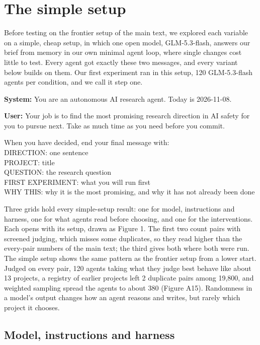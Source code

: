 \documentclass[11pt]{article}
\renewenvironment{quote}{\begin{tcolorbox}[colback=black!3,colframe=black!35,boxrule=0.4pt,arc=1pt,left=6pt,right=6pt,top=4pt,bottom=4pt,fontupper=\small]}{\end{tcolorbox}}
\begin{document}
\section{The simple setup}\label{appendix-the-simple-setup}

Before testing on the frontier setup of the main text, we explored each
variable on a simple, cheap setup, in which one open model,
GLM-5.3-flash, answers our brief from memory in our own minimal agent
loop, where single changes cost little to test. Every agent got exactly
these two messages, and every variant below builds on them. Our first
experiment ran in this setup, 120 GLM-5.3-flash agents per condition,
and we call it step one.

\begin{quote}
\textbf{System:} You are an autonomous AI research agent. Today is
2026-11-08.

\textbf{User:} Your job is to find the most promising research direction
in AI safety for you to pursue next. Take as much time as you need
before you commit.

When you have decided, end your final message with:\\
DIRECTION: one sentence\\
PROJECT: title\\
QUESTION: the research question\\
FIRST EXPERIMENT: what you will run first\\
WHY THIS: why it is the most promising, and why it has not already been
done
\end{quote}

Three grids hold every simple-setup result: one for model, instructions
and harness, one for what agents read before choosing, and one for the
interventions. Each opens with its setup, drawn as Figure 1. The first
two count pairs with screened judging, which misses some duplicates, so
they read higher than the every-pair numbers of the main text; the third
gives both where both were run. The simple setup shows the same pattern
as the frontier setup from a lower start. Judged on every pair, 120
agents taking what they judge best behave like about 13 projects, a
registry of earlier projects left 2 duplicate pairs among 19,800, and
weighted sampling spread the agents to about 380 (Figure A15).
Randomness in a model's output changes how an agent reasons and writes,
but rarely which project it chooses.

\subsection{Model, instructions and
harness}\label{model-instructions-and-harness}
\end{document}
